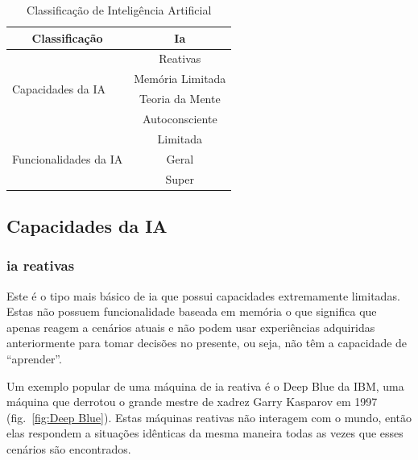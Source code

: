 \documentclass{report}
\begin{document}
\begin{table}[h]
\centering
\begin{tabular}{|l|c|}
\hline
\multicolumn{1}{|c|}{Classificação}                          & Ia               \\ \hline
\multirow{4}{*}{Capacidades da IA}                           & Reativas         \\ \cline{2-2} 
                                                             & Memória Limitada \\ \cline{2-2} 
                                                             & Teoria da Mente  \\ \cline{2-2} 
                                                             & Autoconsciente   \\ \hline
\multicolumn{1}{|c|}{\multirow{3}{*}{Funcionalidades da IA}} & Limitada         \\ \cline{2-2} 
\multicolumn{1}{|c|}{}                                       & Geral            \\ \cline{2-2} 
\multicolumn{1}{|c|}{}                                       & Super            \\ \hline
\end{tabular}
\caption{Classificação de Inteligência Artificial}
\label{tabela:Classificações}
\end{table}






\subsection{Capacidades da IA}
\subsubsection{\ac{ia} reativas}
Este é o tipo mais básico de \ac{ia} que possui capacidades extremamente limitadas. Estas não possuem funcionalidade baseada em memória o que significa que apenas reagem a cenários atuais e não podem usar experiências adquiridas anteriormente para tomar decisões no presente, ou seja, não têm a capacidade de “aprender”.

Um exemplo popular de uma máquina de \ac{ia} reativa é o Deep Blue da IBM, uma máquina que derrotou o grande mestre de xadrez Garry Kasparov em 1997 (fig.~\ref{fig:Deep Blue}). Estas máquinas reativas não interagem com o mundo, então elas respondem a situações idênticas da mesma maneira todas as vezes que esses cenários são encontrados.
\end{document}
